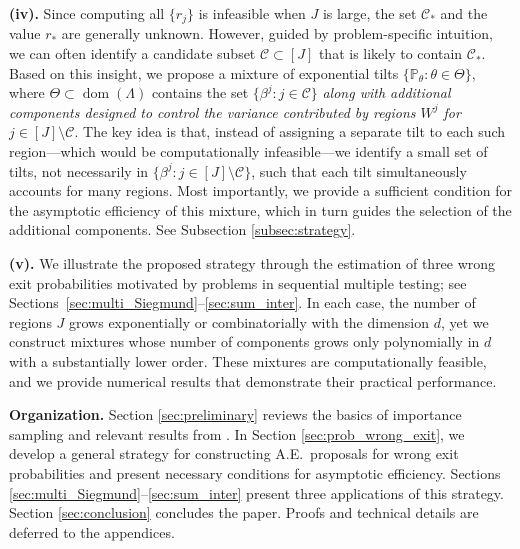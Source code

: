 \documentclass[aap,preprint]{imsart}
\theoremstyle{plain}
\theoremstyle{definition}
\begin{document}
\smallskip
\noindent\textbf{(iv).} Since computing all $\{r_j\}$ is infeasible when $J$ is large, the set $\mathcal{C}_*$ and the value $r_*$ are generally unknown. However, guided by problem-specific intuition, we can often identify a candidate subset $\mathcal{C} \subset [J]$ that is likely to contain $\mathcal{C}_*$. Based on this insight, we propose a mixture of exponential tilts $\{\mathbb{P}_\theta : \theta \in \Theta\}$, where $\Theta \subset \operatorname{dom}(\Lambda)$ contains the set $\{\beta^j : j \in \mathcal{C}\}$ \textit{along with additional components designed to control the variance contributed by regions $W^j$ for $j \in [J] \setminus \mathcal{C}$}. The key idea is that, instead of assigning a separate tilt to each such region---which would be computationally infeasible---we identify a small set of tilts, not necessarily in $\{\beta^j : j \in [J] \setminus \mathcal{C}\}$, such that each tilt simultaneously accounts for many regions. Most importantly, we provide a sufficient condition for the asymptotic efficiency of this mixture, which in turn guides the selection of the additional components. See Subsection \ref{subsec:strategy}.



\smallskip
\noindent\textbf{(v).} We illustrate the proposed strategy through the estimation of three wrong exit probabilities motivated by problems in sequential multiple testing; see Sections~\ref{sec:multi_Siegmund}--\ref{sec:sum_inter}. In each case, the number of regions $J$ grows exponentially or combinatorially with the dimension $d$, yet we construct mixtures whose number of components grows only polynomially in $d$ with a substantially lower order. These mixtures are computationally feasible, and we provide numerical results that demonstrate their practical performance.



 



\smallskip
\noindent\textbf{Organization.} Section \ref{sec:preliminary} reviews the basics of importance sampling and relevant results from \cite{collamore1996,collamore2002}. In Section \ref{sec:prob_wrong_exit}, we develop a general strategy for constructing A.E.\ proposals for wrong exit probabilities and present necessary conditions for asymptotic efficiency. Sections \ref{sec:multi_Siegmund}--\ref{sec:sum_inter} present three applications of this strategy. Section \ref{sec:conclusion} concludes the paper. Proofs and technical details are deferred to the appendices.
\end{document}
